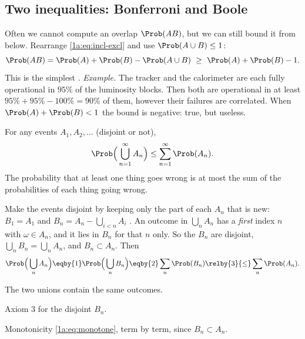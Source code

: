 \subsection{Two inequalities: Bonferroni and Boole}

Often we cannot compute an overlap $\Prob(AB)$, but we can still bound it from
below. Rearrange \eqref{1a:eq:incl-excl} and use $\Prob(A\cup B)\le 1$:
\begin{equation}
\Prob(AB)=\Prob(A)+\Prob(B)-\Prob(A\cup B)\ \ge\ \Prob(A)+\Prob(B)-1 .
\label{1a:eq:bonferroni}
\end{equation}
This is the simplest  .
\emph{Example.} The tracker and the calorimeter are each fully operational in
$95\%$ of the luminosity blocks. Then both are operational in at least
$95\%+95\%-100\%=90\%$ of them, however their failures are correlated. When
$\Prob(A)+\Prob(B)<1$ the bound is negative: true, but useless.

\begin{keyidea}
For any events $A_1,A_2,\dots$ (disjoint or not),
\begin{equation}
\Prob\Bigl(\,\bigcup_{n=1}^\infty A_n\Bigr)\le\sum_{n=1}^\infty\Prob(A_n).
\label{1a:eq:boole}
\end{equation}
The probability that at least one thing goes wrong is at most the sum of the
probabilities of each thing going wrong.
\end{keyidea}

Make the events disjoint by keeping only the part of each $A_n$ that is new:
$B_1=A_1$ and $B_n=A_n-\bigcup_{i<n}A_i$ . An outcome in
$\bigcup_nA_n$ has a \emph{first} index $n$ with $\omega\in A_n$, and it lies in
$B_n$ for that $n$ only. So the $B_n$ are disjoint, $\bigcup_nB_n=\bigcup_nA_n$,
and $B_n\subset A_n$. Then
\begin{align*}
\Prob\Bigl(\,\bigcup_n A_n\Bigr)
\eqby{1}\Prob\Bigl(\,\bigcup_n B_n\Bigr)
\eqby{2}\sum_n\Prob(B_n)
\relby{3}{\le}\sum_n\Prob(A_n).
\end{align*}
\begin{explain}
  \item The two unions contain the same outcomes.
  \item Axiom 3 for the disjoint $B_n$.
  \item Monotonicity \eqref{1a:eq:monotone}, term by term, since $B_n\subset A_n$.
\end{explain}

